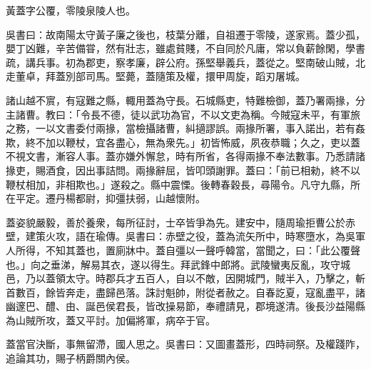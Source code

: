 
\begin{pinyinscope}
黃蓋字公覆，零陵泉陵人也。

吳書曰：故南陽太守黃子廉之後也，枝葉分離，自祖遷于零陵，遂家焉。蓋少孤，嬰丁凶難，辛苦備甞，然有壯志，雖處貧賤，不自同於凡庸，常以負薪餘閑，學書疏，講兵事。初為郡吏，察孝廉，辟公府。孫堅舉義兵，蓋從之。堅南破山賊，北走董卓，拜蓋別部司馬。堅薨，蓋隨策及權，擐甲周旋，蹈刃屠城。

諸山越不賔，有寇難之縣，輙用蓋為守長。石城縣吏，特難檢御，蓋乃署兩掾，分主諸曹。教曰：「令長不德，徒以武功為官，不以文吏為稱。今賊寇未平，有軍旅之務，一以文書委付兩掾，當檢攝諸曹，糾擿謬誤。兩掾所署，事入諾出，若有姦欺，終不加以鞭杖，宜各盡心，無為衆先。」初皆怖威，夙夜恭職；久之，吏以蓋不視文書，漸容人事。蓋亦嫌外懈怠，時有所省，各得兩掾不奉法數事。乃悉請諸掾吏，賜酒食，因出事詰問。兩掾辭屈，皆叩頭謝罪。蓋曰：「前已相勑，終不以鞭杖相加，非相欺也。」遂殺之。縣中震慄。後轉春穀長，尋陽令。凡守九縣，所在平定。遷丹楊都尉，抑彊扶弱，山越懷附。

蓋姿貌嚴毅，善於養衆，每所征討，士卒皆爭為先。建安中，隨周瑜拒曹公於赤壁，建策火攻，語在瑜傳。吳書曰：赤壁之役，蓋為流矢所中，時寒墮水，為吳軍人所得，不知其蓋也，置廁牀中。蓋自彊以一聲呼韓當，當聞之，曰：「此公覆聲也。」向之垂涕，解易其衣，遂以得生。拜武鋒中郎將。武陵蠻夷反亂，攻守城邑，乃以蓋領太守。時郡兵才五百人，自以不敵，因開城門，賊半入，乃擊之，斬首數百，餘皆奔走，盡歸邑落。誅討魁帥，附從者赦之。自春訖夏，寇亂盡平，諸幽邃巴、醴、由、誕邑侯君長，皆改操易節，奉禮請見，郡境遂清。後長沙益陽縣為山賊所攻，蓋又平討。加偏將軍，病卒于官。

蓋當官決斷，事無留滯，國人思之。吳書曰：又圖畫蓋形，四時祠祭。及權踐阼，追論其功，賜子柄爵關內侯。


\end{pinyinscope}
